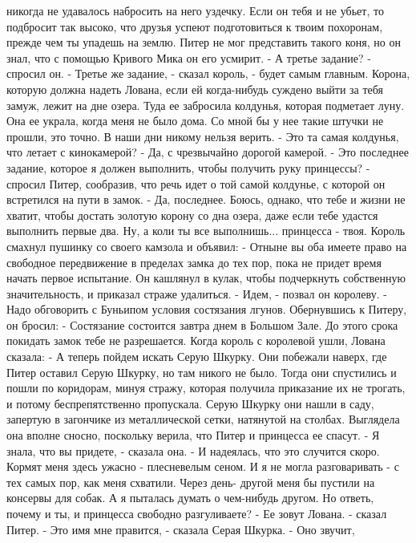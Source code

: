 никогда не удавалось набросить на него уздечку. Если он тебя и не 
убьет, то подбросит так высоко, что друзья успеют подготовиться к 
твоим похоронам, прежде чем ты упадешь на землю.
    Питер не мог представить такого коня, но он знал, что с помощью 
Кривого Мика он его усмирит.
    - А третье задание? - спросил он.
    - Третье же задание, - сказал король, - будет самым главным. 
Корона, которую должна надеть Лована, если ей когда-нибудь суждено 
выйти за тебя замуж, лежит на дне озера. Туда ее забросила колдунья, 
которая подметает луну. Она ее украла, когда меня не было дома. Со 
мной бы у нее такие штучки не прошли, это точно. В наши дни никому 
нельзя верить.
    - Это та самая колдунья, что летает с кинокамерой?
    - Да, с чрезвычайно дорогой камерой.
    - Это последнее задание, которое я должен выполнить, чтобы 
получить руку принцессы? - спросил Питер, сообразив, что речь идет о 
той самой колдунье, с которой он встретился на пути в замок.
    - Да, последнее. Боюсь, однако, что тебе и жизни не хватит, чтобы 
достать золотую корону со дна озера, даже если тебе удастся выполнить 
первые два. Ну, а коли ты все выполнишь... принцесса - твоя.
    Король смахнул пушинку со своего камзола и объявил:
    - Отныне вы оба имеете право на свободное передвижение в пределах 
замка до тех пор, пока не придет время начать первое испытание.
    Он кашлянул в кулак, чтобы подчеркнуть собственную значительность, 
и приказал страже удалиться.
    - Идем, - позвал он королеву. - Надо обговорить с Буньипом условия 
состязания лгунов.
    Обернувшись к Питеру, он бросил:
    - Состязание состоится завтра днем в Большом Зале. До этого срока 
покидать замок тебе не разрешается.
    Когда король с королевой ушли, Лована сказала:
    - А теперь пойдем искать Серую Шкурку.
    Они побежали наверх, где Питер оставил Серую Шкурку, но там никого 
не было. Тогда они спустились и пошли по коридорам, минуя стражу, 
которая получила приказание их не трогать, и потому беспрепятственно 
пропускала. Серую Шкурку они нашли в саду, запертую в загончике из 
металлической сетки, натянутой на столбах. Выглядела она вполне 
сносно, поскольку верила, что Питер и принцесса ее спасут.
    - Я знала, что вы придете, - сказала она. - И надеялась, что это 
случится скоро. Кормят меня здесь ужасно - плесневелым сеном. И я не 
могла разговаривать - с тех самых пор, как меня схватили. Через день-
другой меня бы пустили на консервы для собак. А я пыталась думать о 
чем-нибудь другом. Но ответь, почему и ты, и принцесса свободно 
разгуливаете?
    - Ее зовут Лована. - сказал Питер.
    - Это имя мне правится, - сказала Серая Шкурка. - Оно звучит, 
